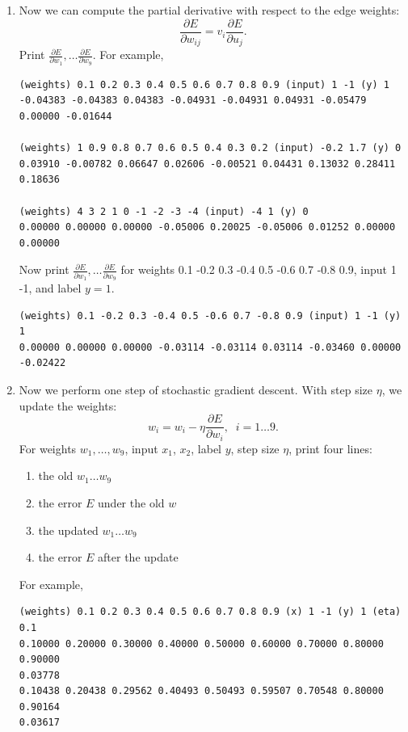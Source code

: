 \documentclass[a4paper]{article}
\theoremstyle{definition}
\newenvironment{soln}{
    \leavevmode\color{blue}\ignorespaces
}{}
\begin{document}
\begin{enumerate}
\begin{soln}

\begin{verbatim}
(weights) 0.1 -0.2 0.3 -0.4 0.5 -0.6 0.7 -0.8 0.9 (input) 1 -1 (y) 1
0.02768 0.00000 -0.03114 -0.03114
\end{verbatim}
\end{soln}


\item
Now we can compute the partial derivative with respect to the edge weights:
$$\frac{\partial E}{\partial w_{ij}} = v_i \frac{\partial E}{\partial u_j}.$$
Print $\frac{\partial E}{\partial w_1}, \ldots \frac{\partial E}{\partial w_9}$. 
For example,
\begin{verbatim}
(weights) 0.1 0.2 0.3 0.4 0.5 0.6 0.7 0.8 0.9 (input) 1 -1 (y) 1
-0.04383 -0.04383 0.04383 -0.04931 -0.04931 0.04931 -0.05479 0.00000 -0.01644

(weights) 1 0.9 0.8 0.7 0.6 0.5 0.4 0.3 0.2 (input) -0.2 1.7 (y) 0
0.03910 -0.00782 0.06647 0.02606 -0.00521 0.04431 0.13032 0.28411 0.18636

(weights) 4 3 2 1 0 -1 -2 -3 -4 (input) -4 1 (y) 0
0.00000 0.00000 0.00000 -0.05006 0.20025 -0.05006 0.01252 0.00000 0.00000
\end{verbatim}
Now print $\frac{\partial E}{\partial w_1}, \ldots \frac{\partial E}{\partial w_9}$
for weights 0.1 -0.2 0.3 -0.4 0.5 -0.6 0.7 -0.8 0.9, input 1 -1, and label $y=1$.

\begin{soln}

\begin{verbatim}
(weights) 0.1 -0.2 0.3 -0.4 0.5 -0.6 0.7 -0.8 0.9 (input) 1 -1 (y) 1
0.00000 0.00000 0.00000 -0.03114 -0.03114 0.03114 -0.03460 0.00000 -0.02422
\end{verbatim}
\end{soln}



\item
Now we perform one step of stochastic gradient descent.  With step size $\eta$, we update the weights:
$$w_i = w_i - \eta \frac{\partial E}{\partial w_i}, \;\; i=1\ldots 9.$$
For weights $w_1, \ldots, w_9$, input $x_1$, $x_2$, label $y$, step size $\eta$,
print four lines:
\begin{enumerate}
\item the old $w_1 \ldots w_9$
\item the error $E$ under the old $w$
\item the updated $w_1 \ldots w_9$
\item the error $E$ after the update
\end{enumerate}
For example,
\begin{verbatim}
(weights) 0.1 0.2 0.3 0.4 0.5 0.6 0.7 0.8 0.9 (x) 1 -1 (y) 1 (eta) 0.1
0.10000 0.20000 0.30000 0.40000 0.50000 0.60000 0.70000 0.80000 0.90000
0.03778
0.10438 0.20438 0.29562 0.40493 0.50493 0.59507 0.70548 0.80000 0.90164
0.03617


\end{verbatim}
\end{enumerate}
\end{document}

